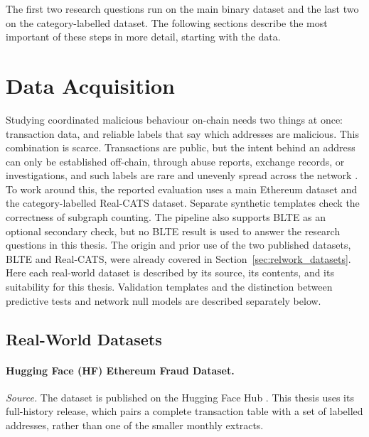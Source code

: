 \documentclass{thesisclass}
\begin{document}
The first two research questions run on the main binary dataset and the last two
on the category-labelled dataset. The following sections describe the most
important of these steps in more detail, starting with the data.

\section{Data Acquisition}
\label{sec:data_acquisition}

Studying coordinated malicious behaviour on-chain needs two things at once:
transaction data, and reliable labels that say which addresses are malicious.
This combination is scarce. Transactions are public, but the intent behind an
address can only be established off-chain, through abuse reports, exchange
records, or investigations, and such labels are rare and unevenly spread across
the network \citep{shi2025realcats}. To work around this, the reported
evaluation uses a main Ethereum dataset and the category-labelled Real-CATS
dataset. Separate synthetic templates check the correctness of subgraph
counting. The pipeline also supports BLTE as an optional secondary
check, but no BLTE result is used to answer the research questions in this
thesis. The origin and prior use of the two published datasets, BLTE and
Real-CATS, were already covered in Section~\ref{sec:relwork_datasets}. Here each
real-world dataset is described by its source, its contents, and its
suitability for this thesis. Validation templates and the distinction between
predictive tests and network null models are described separately below.

\subsection{Real-World Datasets}

\paragraph{Hugging Face (HF) Ethereum Fraud Dataset.}
\label{sec:dataset_hf}
\textit{Source.} The dataset is published on the Hugging Face Hub
\citep{fesevu2025ethfraud}. This thesis uses its full-history release, which
pairs a complete transaction table with a set of labelled addresses, rather than
one of the smaller monthly extracts.
\end{document}
